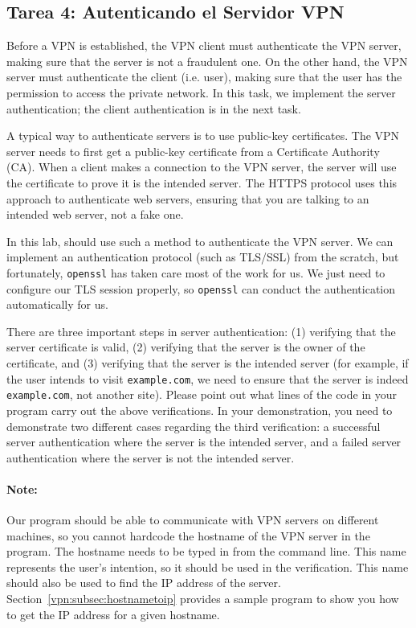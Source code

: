 \subsection{Tarea 4: Autenticando el Servidor VPN}


Before a VPN is established, the VPN client must authenticate
the VPN server, making sure that the server is not a fraudulent 
one. On the other hand, the VPN server must authenticate the
client (i.e. user), making sure that the user has 
the permission to access the private network. 
In this task, we implement the server authentication; 
the client authentication is in the next task. 

A typical way to authenticate servers is to use public-key
certificates. The VPN server needs to first get a public-key 
certificate from a Certificate Authority (CA).
When a client makes a connection to the VPN 
server, the server will use the certificate to prove it 
is the intended server.  
The HTTPS protocol uses this approach to 
authenticate web servers, ensuring that you are talking to 
an intended web server, not a fake one. 


In this lab, \miniVPN should use such a method to authenticate the
VPN server. We can implement an authentication protocol (such
as TLS/SSL) from the scratch, but fortunately, \texttt{openssl} has 
taken care most of the work for us. We just need to configure 
our TLS session properly, so \texttt{openssl} can conduct the authentication
automatically for us.  

There are three important steps in server authentication: (1) verifying that
the server certificate is valid, (2) verifying that the server 
is the owner of the certificate, and (3) verifying that the server is
the intended server (for example, if the user intends to visit 
\texttt{example.com}, we need to ensure that the server is indeed 
\texttt{example.com}, not another site). Please point out what lines of the
code in your program carry out the above verifications. 
In your demonstration, you need to demonstrate two different cases regarding the 
third verification: a successful server authentication where the 
server is the intended server, and a failed server authentication where 
the server is not the intended server. 


\paragraph{Note:} Our \miniVPN program should be able to communicate with
VPN servers on different machines, so you cannot hardcode the hostname of 
the VPN server in the program. The hostname needs to be typed in from the
command line. This name represents the user's intention, so it should be
used in the verification. This name should also be used to find the IP
address of the server. Section~\ref{vpn:subsec:hostnametoip} provides a sample 
program to show you how to get the IP address for a given hostname. 



